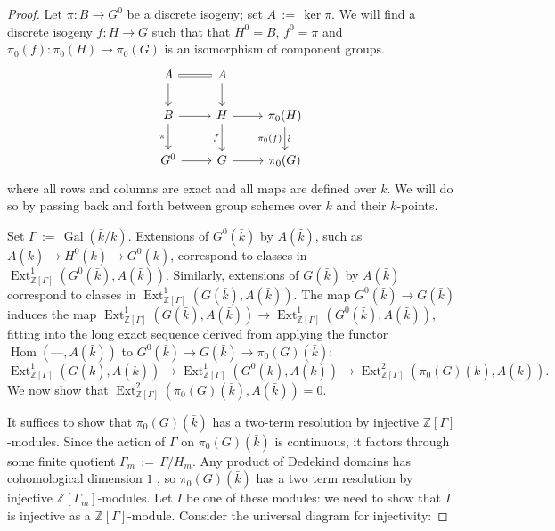 \documentclass[11pt]{amsart}
\theoremstyle{plain}
\theoremstyle{definition}
\theoremstyle{remark}
\newcommand{\ZZ}{{\mathbb{Z}}}
\newcommand{\bFq}{\bar{k}}
\newcommand{\Fq}{k}
\DeclareMathOperator{\Gal}{Gal}
\DeclareMathOperator{\Hom}{Hom}
\DeclareMathOperator{\Ext}{Ext}
\newcommand{\ceq}{{\, :=\, }}
\newcommand\David[1]{\marginpar{\smaller\smaller DR: #1}}
\begin{document}
\begin{proof}
Let $\pi: B \to G^0$ be a discrete isogeny; set $A \ceq \ker \pi$.
  We will find a discrete isogeny $f: H\to G$
  such that that $H^0 = B$, $f^0 =\pi$ and
  $\pi_0(f) : \pi_0(H)\to \pi_0(G)$ is an isomorphism of component
  groups.
  \begin{equation}\label{extension-diagram}
  \begin{tikzcd}
  A \arrow[equal]{r} \dar & A \dar \\
  B \rar \dar[swap]{\pi} & H \rar \dar[swap]{f} & \pi_0(H) \arrow{d}[below,rotate=90]{\sim}[swap]{\pi_0(f)} \\
  G^0 \rar & G \rar & \pi_0(G)
  \end{tikzcd}
  \end{equation}
  where all rows and columns are exact and all maps are defined over
  $\Fq$.  We will do so by passing back and forth between group
  schemes over $\Fq$ and their $\bFq$-points.  
  
  Set $\Gamma \ceq \Gal(\bFq/\Fq)$. Extensions of
  $G^0(\bFq)$ by $A(\bFq)$, such as $A(\bFq) \to H^0(\bFq) \to G^0(\bFq)$,
  correspond to classes in $\Ext^1_{\ZZ[\Gamma]}(G^0(\bFq), A(\bFq))$.
  Similarly, extensions of $G(\bFq)$ by $A(\bFq)$ correspond to
  classes in $\Ext^1_{\ZZ[\Gamma]}(G(\bFq), A(\bFq))$.  The map
  $G^0(\bFq) \to G(\bFq)$ induces the map
  $\Ext^1_{\ZZ[\Gamma]}(G(\bFq), A(\bFq)) \to \Ext^1_{\ZZ[\Gamma]}(G^0(\bFq), A(\bFq))$,
  fitting into the long exact sequence derived from applying
  the functor $\Hom(\mbox{---}, A(\bFq))$ to $G^0(\bFq) \to G(\bFq) \to \pi_0(G)(\bFq)$:
  \[
  \Ext^1_{\ZZ[\Gamma]}(G(\bFq), A(\bFq)) \to \Ext^1_{\ZZ[\Gamma]}(G^0(\bFq), A(\bFq)) \to \Ext^2_{\ZZ[\Gamma]}(\pi_0(G)(\bFq), A(\bFq)).
  \]
  We now show that $\Ext^2_{\ZZ[\Gamma]}(\pi_0(G)(\bFq), A(\bFq)) = 0$.

  It suffices to show that $\pi_0(G)(\bFq)$ has a two-term resolution
  by injective $\ZZ[\Gamma]$-modules.  Since the action of $\Gamma$ on
  $\pi_0(G)(\bFq)$ is continuous, it factors through some finite quotient
  $\Gamma_m \ceq \Gamma / H_m$.  Any product of Dedekind domains has
  cohomological dimension $1$ \David{Add a citation for this fact}, so $\pi_0(G)(\bFq)$ has a
  two term resolution by injective $\ZZ[\Gamma_m]$-modules.  Let $I$
  be one of these modules: we need to show that $I$ is injective as a
  $\ZZ[\Gamma]$-module.  Consider the universal diagram for injectivity:
  

\end{proof}
\end{document}
